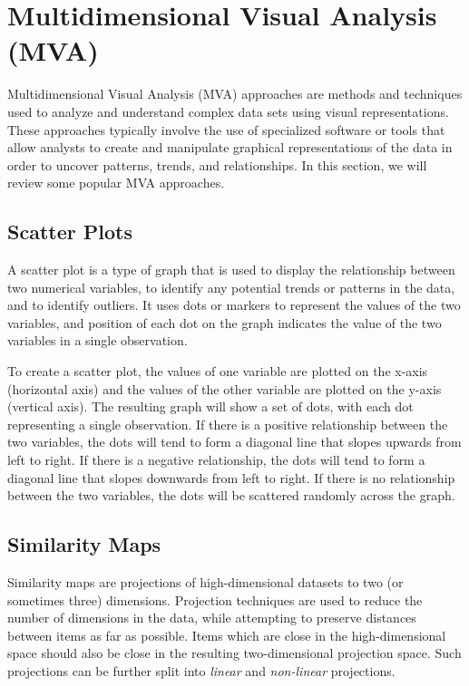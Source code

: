 
\chapter{Multidimensional Visual Analysis (MVA)}

\label{chap:MVA}

Multidimensional Visual Analysis (MVA) approaches are methods and
techniques used to analyze and understand complex data sets using
visual representations. These approaches typically involve the use of
specialized software or tools that allow analysts to create and
manipulate graphical representations of the data in order to uncover
patterns, trends, and relationships. In this section, we will review
some popular MVA approaches.



\section{Scatter Plots}

A scatter plot is a type of graph that is used to display the
relationship between two numerical variables, to identify any
potential trends or patterns in the data, and to identify outliers. It
uses dots or markers to represent the values of the two variables, and
position of each dot on the graph indicates the value of the two
variables in a single observation.

To create a scatter plot, the values of one variable are plotted on
the x-axis (horizontal axis) and the values of the other variable are
plotted on the y-axis (vertical axis). The resulting graph will show a
set of dots, with each dot representing a single observation. If there
is a positive relationship between the two variables, the dots will
tend to form a diagonal line that slopes upwards from left to
right. If there is a negative relationship, the dots will tend to form
a diagonal line that slopes downwards from left to right. If there is
no relationship between the two variables, the dots will be scattered
randomly across the graph.





\section{Similarity Maps}

Similarity maps are projections of high-dimensional datasets to two
(or sometimes three) dimensions. Projection techniques are used to
reduce the number of dimensions in the data, while attempting to
preserve distances between items as far as possible. Items which are
close in the high-dimensional space should also be close in the
resulting two-dimensional projection space. Such projections can be
further split into \emph{linear} and \emph{non-linear} projections.


